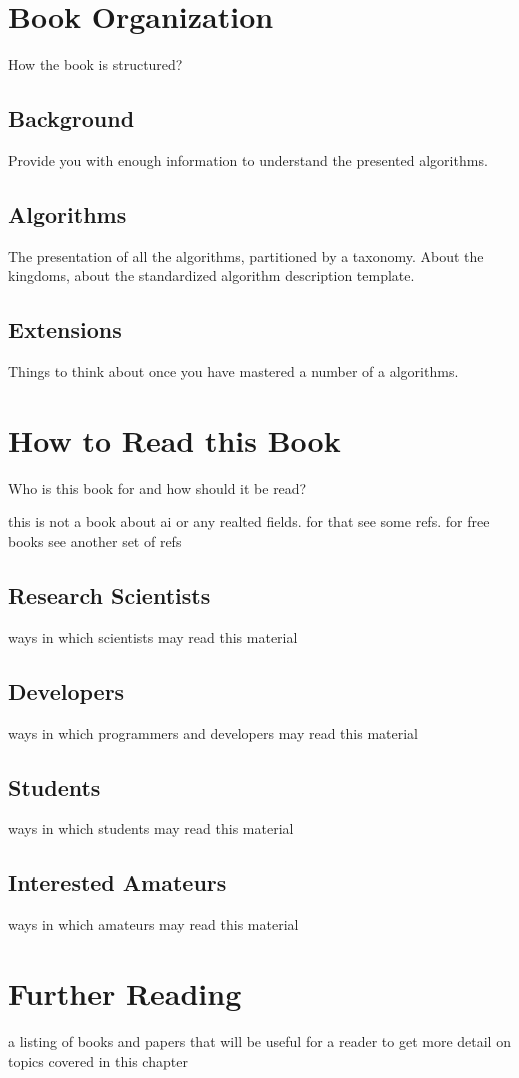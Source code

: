 % 
% 
\section{Book Organization}
\label{intro:sec:organization}
How the book is structured?

\subsection{Background}
Provide you with enough information to understand the presented algorithms.

\subsection{Algorithms}
The presentation of all the algorithms, partitioned by a taxonomy. 
About the kingdoms, about the standardized algorithm description template.

\subsection{Extensions}
Things to think about once you have mastered a number of a algorithms.


% 
% 
\section{How to Read this Book}
\label{intro:sec:how_to_read}
Who is this book for and how should it be read?

this is not a book about ai or any realted fields. for that see some refs. 
for free books see another set of refs

\subsection{Research Scientists}
ways in which scientists may read this material

\subsection{Developers}
ways in which programmers and developers may read this material

\subsection{Students}
ways in which students may read this material

\subsection{Interested Amateurs}
ways in which amateurs may read this material


% 
% 
\section{Further Reading}
\label{intro:sec:further_reading}

a listing of books and papers that will be useful for a reader to get more detail on topics covered in this chapter

